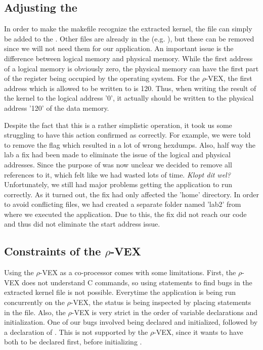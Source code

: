 \subsection{Adjusting the }
In order to make the makefile recognize the extracted kernel, the file can simply be added to the . Other files are already in the  (e.g. ), but these can be removed since we will not need them for our application. An important issue is the difference between logical memory and physical memory. While the first address of a logical memory is obviously zero, the physical memory can have the first part of the register being occupied by the operating system. For the $\rho$-VEX, the first address which is allowed to be written to is 120. Thus, when writing the result of the kernel to the logical address '0', it actually should be written to the physical address '120' of the data memory. %

Despite the fact that this is a rather simplistic operation, it took us some struggling to have this action confirmed as correctly. For example, we were told to remove the  flag which resulted in a lot of wrong hexdumps. Also, half way the lab a fix had been made to eliminate the issue of the logical and physical addresses. Since the purpose of  was now unclear we decided to remove all references to it, which felt like we had wasted lots of time. \emph{Klopt dit wel?} 	Unfortunately, we still had major problems getting the application to run correctly. As it turned out, the fix had only affected the 'home' directory. In order to avoid conflicting files, we had created a separate folder named 'lab2' from where we executed the application. Due to this, the fix did not reach our code and thus did not eliminate the start address issue.

\subsection{Constraints of the $\rho$-VEX}
Using the $\rho$-VEX as a co-processor comes with some limitations. First, the $\rho$-VEX does not understand C commands, so using  statements to find bugs in the extracted kernel file is not possible. Everytime the application is being run concurrently on the $\rho$-VEX, the status is being inspected by placing  statements in the  file. Also, the $\rho$-VEX is very strict in the order of variable declarations and initialization. One of our bugs involved  being declared and initialized, followed by a declaration of . This is not supported by the $\rho$-VEX, since it wants to have  both to be declared first, before initializing .

